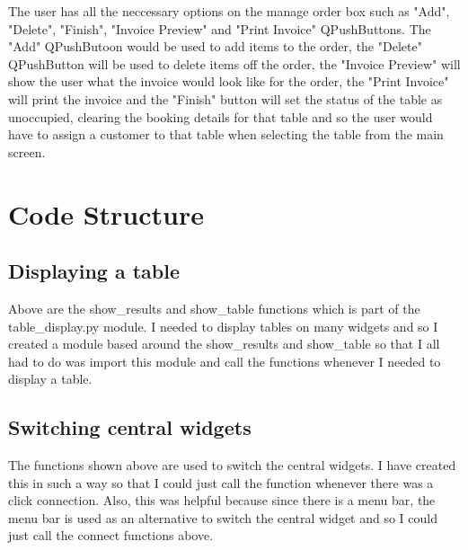 The user has all the neccessary options on the manage order box such as "Add", "Delete", "Finish", "Invoice Preview" and "Print Invoice" QPushButtons. The "Add" QPushButoon would be used to add items to the order, the "Delete" QPushButton will be used to delete items off the order, the "Invoice Preview" will show the user what the invoice would look like for the order, the "Print Invoice" will print the invoice and the "Finish" button will set the status of the table as unoccupied, clearing the booking details for that table and so the user would have to assign a customer to that table when selecting the table from the main screen.


\section{Code Structure}


\subsection{Displaying a table}
\begin{figure}[H]
\end{figure}

Above are the show\_results and show\_table functions which is part of the table\_display.py module. I needed to display tables on many widgets and so I created a module based around the show\_results and show\_table so that I all had to do was import this module and call the functions whenever I needed to display a table.

\subsection{Switching central widgets}
\begin{figure}[H]
\end{figure}
The functions shown above are used to switch the central widgets. I have created this in such a way so that I could just call the function whenever there was a click connection. Also, this was helpful because since there is a menu bar, the menu bar is used as an alternative to switch the central widget and so I could just call the connect functions above. 

